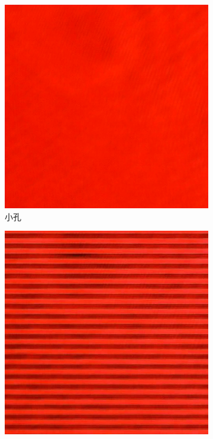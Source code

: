 \documentclass[a4paper]{article}
\begin{document}
\begin{figure}[H]
    \centering
    \begin{subfigure}[t]{0.4\textwidth}
        \centering
        \includegraphics[height=\textheight/5]{img2-done/4-2.JPG}
        \caption{小孔}
        \label{fig5-1}
    \end{subfigure}
    \begin{subfigure}[t]{0.4\textwidth}
        \centering
        \includegraphics[height=\textheight/5]{img2-done/4-3.JPG}

\end{subfigure}
\end{figure}
\end{document}
